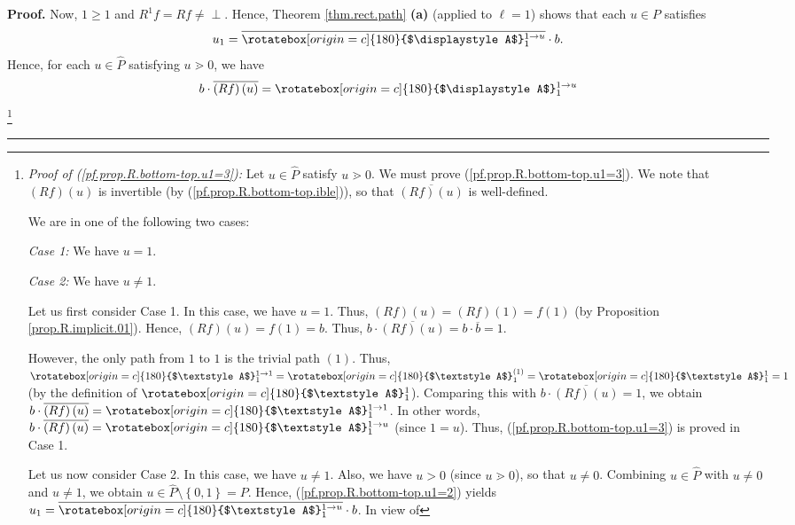 \documentclass[numbers=enddot,12pt,final,onecolumn,notitlepage]{scrartcl}%
\theoremstyle{definition}
\newenvironment{verlong}{}{}
\newcommand{\undf}{\operatorname*{\bot}}
\newcommand{\upslack}{\mathchoice{\rotatebox[origin=c]{180}{$\displaystyle A$}}{\rotatebox[origin=c]{180}{$\textstyle A$}}{\rotatebox[origin=c]{180}{$\scriptstyle A$}}{\rotatebox[origin=c]{180}{$\scriptscriptstyle A$}}}
\newenvironment{proof}[1][Proof]{\noindent\textbf{#1.} }{\ \rule{0.5em}{0.5em}}
\begin{document}
\begin{verlong}
\begin{proof}
Now, $1\geq1$ and $R^{1}f=Rf\neq\undf$. Hence, Theorem \ref{thm.rect.path}
\textbf{(a)} (applied to $\ell=1$) shows that each $u\in P$ satisfies%
\begin{equation}
u_{1}=\overline{\upslack_{1}^{1\rightarrow u}}\cdot b.
\label{pf.prop.R.bottom-top.u1=2}%
\end{equation}
Hence, for each $u\in\widehat{P}$ satisfying $u\gtrdot0$, we have%
\begin{equation}
b\cdot\overline{\left(  Rf\right)  \left(  u\right)  }=\upslack_{1}%
^{1\rightarrow u} \label{pf.prop.R.bottom-top.u1=3}%
\end{equation}
\footnote{\textit{Proof of (\ref{pf.prop.R.bottom-top.u1=3}):} Let
$u\in\widehat{P}$ satisfy $u\gtrdot0$. We must prove
(\ref{pf.prop.R.bottom-top.u1=3}). We note that $\left(  Rf\right)  \left(
u\right)  $ is invertible (by (\ref{pf.prop.R.bottom-top.ible})), so that
$\overline{\left(  Rf\right)  \left(  u\right)  }$ is well-defined.
\par
We are in one of the following two cases:
\par
\textit{Case 1:} We have $u=1$.
\par
\textit{Case 2:} We have $u\neq1$.
\par
Let us first consider Case 1. In this case, we have $u=1$. Thus, $\left(
Rf\right)  \left(  u\right)  =\left(  Rf\right)  \left(  1\right)  =f\left(
1\right)  $ (by Proposition \ref{prop.R.implicit.01}). Hence, $\left(
Rf\right)  \left(  u\right)  =f\left(  1\right)  =b$. Thus, $b\cdot
\overline{\left(  Rf\right)  \left(  u\right)  }=b\cdot\overline{b}=1$.
\par
However, the only path from $1$ to $1$ is the trivial path $\left(  1\right)
$. Thus, $\upslack_{1}^{1\rightarrow1}=\upslack_{1}^{\left(  1\right)
}=\upslack_{1}^{1}=1$ (by the definition of $\upslack_{1}^{1}$). Comparing
this with $b\cdot\overline{\left(  Rf\right)  \left(  u\right)  }=1$, we
obtain $b\cdot\overline{\left(  Rf\right)  \left(  u\right)  }=\upslack_{1}%
^{1\rightarrow1}$. In other words, $b\cdot\overline{\left(  Rf\right)  \left(
u\right)  }=\upslack_{1}^{1\rightarrow u}$ (since $1=u$). Thus,
(\ref{pf.prop.R.bottom-top.u1=3}) is proved in Case 1.
\par
Let us now consider Case 2. In this case, we have $u\neq1$. Also, we have
$u>0$ (since $u\gtrdot0$), so that $u\neq0$. Combining $u\in\widehat{P}$ with
$u\neq0$ and $u\neq1$, we obtain $u\in\widehat{P}\setminus\left\{
0,1\right\}  =P$. Hence, (\ref{pf.prop.R.bottom-top.u1=2}) yields
$u_{1}=\overline{\upslack_{1}^{1\rightarrow u}}\cdot b$. In view of
}
\end{proof}
\end{verlong}
\end{document}

